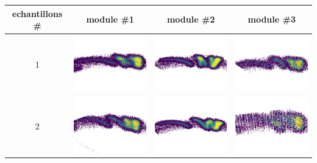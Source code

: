 \begin{table}[h]
\centering
\begin{tabular}{|c|c|c|c|}
\hline
echantillons \# & module \#1 & module \#2 & module \#3\\
\hline
1 & \includegraphics[scale=0.4]{images/m11.png} & \includegraphics[scale=0.4]{images/m21.png} & \includegraphics[scale=0.4]{images/m31.png}  \\
\hline
2 & \includegraphics[scale=0.4]{images/m12.png} & \includegraphics[scale=0.4]{images/m22.png} & \includegraphics[scale=0.4]{images/m32.png}  \\

\end{tabular}
\end{table}
